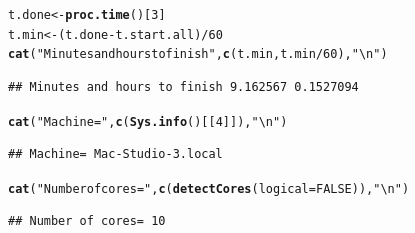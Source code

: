 \documentclass[9pt]{article}\usepackage[]{graphicx}\usepackage[]{xcolor}
\makeatletter
\newcommand{\hlnum}[1]{\textcolor[rgb]{0.686,0.059,0.569}{#1}}%
\newcommand{\hlstr}[1]{\textcolor[rgb]{0.192,0.494,0.8}{#1}}%
\newcommand{\hlopt}[1]{\textcolor[rgb]{0,0,0}{#1}}%
\newcommand{\hlstd}[1]{\textcolor[rgb]{0.345,0.345,0.345}{#1}}%
\newcommand{\hlkwb}[1]{\textcolor[rgb]{0.69,0.353,0.396}{#1}}%
\newcommand{\hlkwc}[1]{\textcolor[rgb]{0.333,0.667,0.333}{#1}}%
\newcommand{\hlkwd}[1]{\textcolor[rgb]{0.737,0.353,0.396}{\textbf{#1}}}%
\newenvironment{kframe}{%
 \def\at@end@of@kframe{}%
 \ifinner\ifhmode%
  \def\at@end@of@kframe{\end{minipage}}%
  \begin{minipage}{\columnwidth}%
 \fi\fi%
 \def\FrameCommand##1{\hskip\@totalleftmargin \hskip-\fboxsep
 \colorbox{shadecolor}{##1}\hskip-\fboxsep
     \hskip-\linewidth \hskip-\@totalleftmargin \hskip\columnwidth}%
 \MakeFramed {\advance\hsize-\width
   \@totalleftmargin\z@ \linewidth\hsize
   \@setminipage}}%
 {\par\unskip\endMakeFramed%
 \at@end@of@kframe}
\newenvironment{knitrout}{}{} %
\theoremstyle{definition}
\theoremstyle{remark}
\makeatother
\begin{document}
\begin{knitrout}
\color{fgcolor}\begin{kframe}
\begin{alltt}
\hlstd{t.done} \hlkwb{<-} \hlkwd{proc.time}\hlstd{()[}\hlnum{3}\hlstd{]}
\hlstd{t.min} \hlkwb{<-} \hlstd{(t.done} \hlopt{-} \hlstd{t.start.all)}\hlopt{/}\hlnum{60}
\hlkwd{cat}\hlstd{(}\hlstr{"Minutes and hours to finish"}\hlstd{,} \hlkwd{c}\hlstd{(t.min, t.min}\hlopt{/}\hlnum{60}\hlstd{),} \hlstr{"\textbackslash{}n"}\hlstd{)}
\end{alltt}
\begin{verbatim}
## Minutes and hours to finish 9.162567 0.1527094
\end{verbatim}
\begin{alltt}
\hlkwd{cat}\hlstd{(}\hlstr{"Machine="}\hlstd{,} \hlkwd{c}\hlstd{(}\hlkwd{Sys.info}\hlstd{()[[}\hlnum{4}\hlstd{]]),} \hlstr{"\textbackslash{}n"}\hlstd{)}
\end{alltt}
\begin{verbatim}
## Machine= Mac-Studio-3.local
\end{verbatim}
\begin{alltt}
\hlkwd{cat}\hlstd{(}\hlstr{"Number of cores="}\hlstd{,} \hlkwd{c}\hlstd{(}\hlkwd{detectCores}\hlstd{(}\hlkwc{logical} \hlstd{=} \hlnum{FALSE}\hlstd{)),} \hlstr{"\textbackslash{}n"}\hlstd{)}
\end{alltt}
\begin{verbatim}
## Number of cores= 10
\end{verbatim}
\end{kframe}
\end{knitrout}
\end{document}
